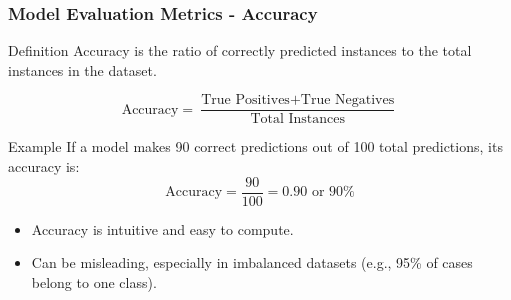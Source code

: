 \documentclass[aspectratio=169]{beamer}
\begin{document}
\begin{frame}[fragile]
    \frametitle{Model Evaluation Metrics - Accuracy}
    \begin{block}{Definition}
        Accuracy is the ratio of correctly predicted instances to the total instances in the dataset.
    \end{block}

    \begin{equation}
        \text{Accuracy} = \frac{\text{True Positives} + \text{True Negatives}}{\text{Total Instances}}
    \end{equation}

    \begin{block}{Example}
        If a model makes 90 correct predictions out of 100 total predictions, its accuracy is:
        \[
        \text{Accuracy} = \frac{90}{100} = 0.90 \text{ or } 90\%
        \]
    \end{block}

    \begin{itemize}
        \item Accuracy is intuitive and easy to compute.
        \item Can be misleading, especially in imbalanced datasets (e.g., 95\% of cases belong to one class).
    \end{itemize}
\end{frame}
\end{document}
